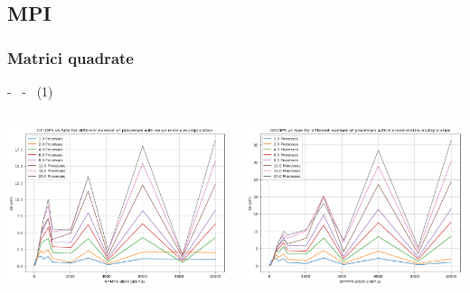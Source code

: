 \documentclass[compress]{beamer}
\begin{document}
\subsection{MPI}
\subsubsection*{Matrici quadrate}
\begin{frame}{\secname \text{ }- \subsecname\ \text{ }- \subsubsecname\ (1)}
    \begin{columns}
            \begin{minipage}{1\textwidth}
                \centering
                \begin{adjustbox}{margin=0cm 0.5cm 0cm 0cm, center} %
                    \includegraphics[width=1\textwidth, frame]{resources/quadrate_naive.png}
                \end{adjustbox}
            \end{minipage}
            \begin{minipage}{1\textwidth}
                \centering
                \begin{adjustbox}{margin=0cm 0.5cm 0cm 0cm, center} %
                    \includegraphics[width=1\textwidth, frame]{resources/quadrate_blocked.png}

\end{adjustbox}
\end{minipage}
\end{columns}
\end{frame}
\end{document}
